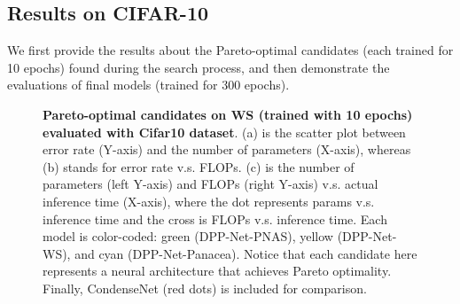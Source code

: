 \documentclass[runningheads]{llncs}
\begin{document}
\begin{table}[h]
\caption{\textbf{Hardware Specifications and Numbers of Objectives.}
For WS, 64 GB is the CPU memory and 12 GB is the GPU memory. In ES, memory space is shared among CPU and GPU}
\label{tb.hwsettings}
\centering
{}
\end{table}\subsection{Results on CIFAR-10}
We first provide the results about the Pareto-optimal candidates (each trained for 10 epochs) found during the search process, and then demonstrate the evaluations of final models (trained for 300 epochs).

\begin{figure}[h]
\centering
{}
\caption{\textbf{Pareto-optimal candidates on WS (trained with 10 epochs) evaluated with Cifar10 dataset}.
(a) is the scatter plot between error rate (Y-axis) and the number of parameters (X-axis), whereas (b) stands for error rate v.s. FLOPs. (c) is the number of parameters (left Y-axis) and FLOPs (right Y-axis) v.s. actual inference time (X-axis), where the dot represents params v.s. inference time and the cross is FLOPs v.s. inference time. Each model is color-coded: green (DPP-Net-PNAS), yellow (DPP-Net-WS), and cyan (DPP-Net-Panacea). Notice that each candidate here represents a neural architecture that achieves Pareto optimality. Finally, CondenseNet (red dots) is included for comparison.}
\label{fig.paretofront}
\end{figure}
\end{document}
